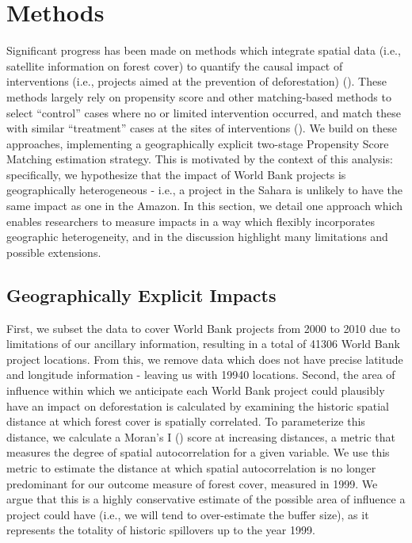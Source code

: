 \documentclass{article}\usepackage[]{graphicx}\usepackage[]{color}
\newenvironment{knitrout}{}{}  %
\begin{document}
\begin{knitrout}
\section{Methods}
Significant progress has been made on methods which integrate spatial data (i.e., satellite information on forest cover) to quantify the causal impact of interventions (i.e., projects aimed at the prevention of deforestation) (\cite{nelson_effectiveness_2011}).  
These methods largely rely on propensity score and other matching-based methods to select ``control'' cases where no or limited intervention occurred, and match these with similar ``treatment'' cases at the sites of interventions (\cite{andam_measuring_2008}). 
We build on these approaches, implementing a geographically explicit two-stage Propensity Score Matching estimation strategy.
This is motivated by the context of this analysis: specifically, we hypothesize that the impact of World Bank projects is geographically heterogeneous - i.e., a project in the Sahara is unlikely to have the same impact as one in the Amazon.
In this section, we detail one approach which enables researchers to measure impacts in a way which flexibly incorporates geographic heterogeneity, and in the discussion highlight many limitations and possible extensions.


\subsection{Geographically Explicit Impacts}
First, we subset the data to cover World Bank projects from 2000 to 2010 due to limitations of our ancillary information, resulting in a total of 41306 World Bank project locations. 
From this, we remove data which does not have precise latitude and longitude information - leaving us with 19940 locations.
Second, the area of influence within which we anticipate each World Bank project could plausibly have an impact on deforestation is calculated by examining the historic spatial distance at which forest cover is spatially correlated. 
To parameterize this distance, we calculate a Moran's I (\cite{getis_analysis_1992}) score at increasing distances, a metric that measures the degree of spatial autocorrelation for a given variable.
We use this metric to estimate the distance at which spatial autocorrelation is no longer predominant for our outcome measure of forest cover, measured in 1999.  
We argue that this is a highly conservative estimate of the possible area of influence a project could have (i.e., we will tend to over-estimate the buffer size), as it represents the totality of historic spillovers up to the year 1999.


\end{knitrout}
\end{document}
